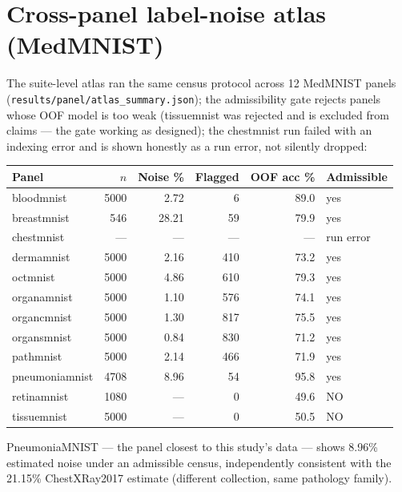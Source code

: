 
\section{Cross-panel label-noise atlas (MedMNIST)}
The suite-level atlas ran the same census protocol across 12 MedMNIST
panels (\texttt{results/panel/atlas\_summary.json}); the admissibility
gate rejects panels whose OOF model is too weak (tissuemnist was rejected
and is excluded from claims --- the gate working as designed); the
chestmnist run failed with an indexing error and is shown honestly as a
run error, not silently dropped:
\begin{longtable}{l r r r r l}
\hline Panel & $n$ & Noise \% & Flagged & OOF acc \% & Admissible \\
\hline \endhead
bloodmnist & 5000 & 2.72 & 6 & 89.0 & yes \\
breastmnist & 546 & 28.21 & 59 & 79.9 & yes \\
chestmnist & --- & --- & --- & --- & run error \\
dermamnist & 5000 & 2.16 & 410 & 73.2 & yes \\
octmnist & 5000 & 4.86 & 610 & 79.3 & yes \\
organamnist & 5000 & 1.10 & 576 & 74.1 & yes \\
organcmnist & 5000 & 1.30 & 817 & 75.5 & yes \\
organsmnist & 5000 & 0.84 & 830 & 71.2 & yes \\
pathmnist & 5000 & 2.14 & 466 & 71.9 & yes \\
pneumoniamnist & 4708 & 8.96 & 54 & 95.8 & yes \\
retinamnist & 1080 & --- & 0 & 49.6 & NO \\
tissuemnist & 5000 & --- & 0 & 50.5 & NO \\
\hline
\end{longtable}
PneumoniaMNIST --- the panel closest to this study's data --- shows
8.96\% estimated noise under an admissible census, independently
consistent with the 21.15\% ChestXRay2017 estimate (different collection,
same pathology family).
